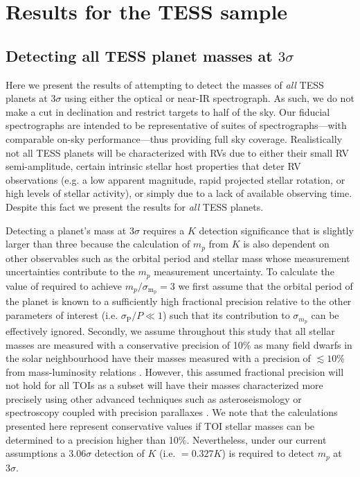 \section{Results for the TESS sample} \label{RVFCsect:results}
\subsection{Detecting all TESS planet masses at $3\sigma$} \label{RVFCsect:all}
Here we present the results of attempting to detect the masses of \emph{all} TESS planets at $3\sigma$
using either the optical or near-IR spectrograph. As such, we do not make a cut in declination and restrict
targets to half of the sky. Our fiducial spectrographs are intended to be representative of suites of
spectrographs---with comparable on-sky performance---thus providing full sky coverage. 
Realistically not all TESS planets will
be characterized with RVs due to either their small RV semi-amplitude, certain intrinsic stellar
host properties that deter RV observations (e.g. a low apparent
magnitude, rapid projected stellar rotation, or high levels of stellar activity), or simply due to
a lack of available observing time. Despite this fact we present the results for \emph{all} TESS
planets.

Detecting a planet's mass at $3\sigma$ requires a $K$ detection significance that is slightly larger
than three because the calculation of $m_p$ from $K$ is also dependent on other observables such as the
orbital period and stellar mass whose measurement uncertainties contribute to the $m_p$ measurement uncertainty.
To calculate the value of \sigK{}
required to achieve $m_p / \sigma_{\text{m}_\text{p}}=3$ we first assume that the orbital period
of the planet is known to a sufficiently high fractional precision relative to the other parameters
of interest (i.e. $\sigma_{\text{P}}/P \ll 1$) such that its contribution to $\sigma_{m_p}$
can be effectively ignored. Secondly, we assume throughout this study
that all stellar masses are measured with a conservative 
precision of 10\% as many field dwarfs in the solar neighbourhood have their masses measured
with a precision of $\lesssim 10$\% from mass-luminosity relations \citep{delfosse00, torres10}.
However, this assumed fractional precision will not hold for all TOIs as a
subset will have their masses characterized more precisely using other advanced techniques such as
asteroseismology or spectroscopy coupled with precision parallaxes \citep[e.g.][]{vaneylen18,fulton18}.
We note that the calculations presented here represent conservative
values if TOI stellar masses can be determined to a precision higher than 10\%. 
Nevertheless, under our current assumptions a $3.06\sigma$ detection of $K$
(i.e. \sigK{} $=0.327 K$) is required to detect $m_p$ at $3\sigma$.

